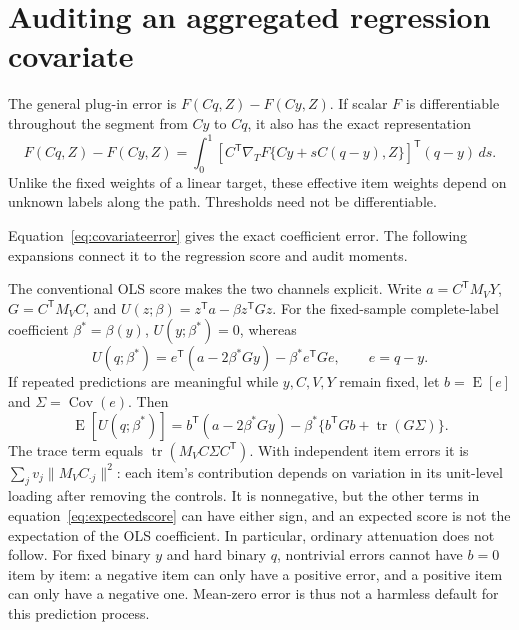 \documentclass[11pt,letterpaper]{article}
\newcommand{\E}{\operatorname{E}}
\newcommand{\Cov}{\operatorname{Cov}}
\begin{document}
\section{Auditing an aggregated regression covariate}\label{app:covariates}
The general plug-in error is $F(Cq,Z)-F(Cy,Z)$. If scalar $F$ is
differentiable throughout the segment from $Cy$ to $Cq$, it also has the
exact representation
\begin{equation}\label{eq:nonlinearweights}
 F(Cq,Z)-F(Cy,Z)
 =\int_0^1
 \left[C^{\mathsf T}\nabla_TF\{Cy+sC(q-y),Z\}\right]^{\mathsf T}
 (q-y)\,ds.
\end{equation}
Unlike the fixed weights of a linear target, these effective item weights
depend on unknown labels along the path. Thresholds need not be
differentiable.

Equation~\eqref{eq:covariateerror} gives the exact coefficient error.
The following expansions connect it to the regression score and audit moments.

The conventional OLS score makes the two channels explicit. Write
$a=C^{\mathsf T}M_VY$, $G=C^{\mathsf T}M_VC$, and
$U(z;\beta)=z^{\mathsf T}a-\beta z^{\mathsf T}Gz$. For the fixed-sample
complete-label coefficient $\beta^*=\beta(y)$, $U(y;\beta^*)=0$, whereas
\begin{equation}\label{eq:covariatescore}
 U(q;\beta^*)
 =e^{\mathsf T}(a-2\beta^*Gy)-\beta^*e^{\mathsf T}Ge,
 \qquad e=q-y.
\end{equation}
If repeated predictions are meaningful while $y,C,V,Y$ remain fixed, let
$b=\E[e]$ and $\Sigma=\Cov(e)$. Then
\begin{equation}\label{eq:expectedscore}
 \E[U(q;\beta^*)]
 =b^{\mathsf T}(a-2\beta^*Gy)
  -\beta^*\{b^{\mathsf T}Gb+\operatorname{tr}(G\Sigma)\}.
\end{equation}
The trace term equals $\operatorname{tr}(M_VC\Sigma C^{\mathsf T})$.
With independent item errors it is
$\sum_jv_j\|M_VC_{\cdot j}\|^2$: each item's contribution depends on
variation in its unit-level loading after removing the controls. It is
nonnegative, but the other terms in equation~\eqref{eq:expectedscore} can
have either sign, and an expected score is not the expectation of the OLS
coefficient. In particular, ordinary attenuation does not follow. For
fixed binary $y$ and hard binary $q$, nontrivial errors cannot have $b=0$
item by item: a negative item can only have a positive error, and a positive
item can only have a negative one. Mean-zero error is thus not a harmless
default for this prediction process.
\end{document}
